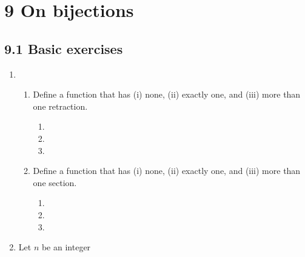 \documentclass[10pt,\jkfside,a4paper]{article}
\begin{document}
\section*{9 On bijections}

\subsection*{9.1 Basic exercises}

\begin{enumerate}

\item 

\begin{enumerate}

\item Define a function that has (i) none, (ii) exactly one, and (iii) more than one retraction.

\begin{enumerate}[label=(\roman*)]

\item



\item



\item



\end{enumerate}

\item Define a function that has (i) none, (ii) exactly one, and (iii) more than one section.

\begin{enumerate}[label=(\roman*)]

\item 



\item



\item



\end{enumerate}

\end{enumerate}

\item Let $n$ be an integer

\begin{enumerate}


\end{enumerate}
\end{enumerate}
\end{document}
